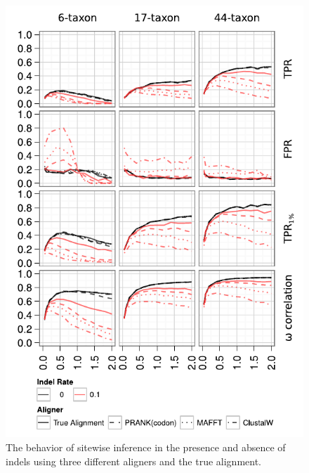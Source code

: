 \documentclass{mbe}
\begin{document}
\begin{figure}[t]
\begin{center}
\includegraphics[scale=0.75]{fig3.pdf}
\end{center}
\caption{The behavior of sitewise inference in the presence and absence of indels using three different aligners and the true alignment.}
\label{fig_3}
\end{figure}
\end{document}
